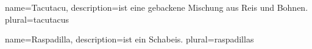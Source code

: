 {
  name=Tacutacu,
  description={ist eine gebackene Mischung aus Reis und Bohnen.}
  plural=tacutacus
}

{
  name=Raspadilla,
  description={ist ein Schabeis.}
  plural=raspadillas
}